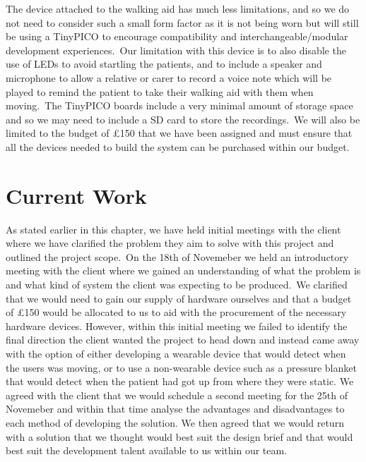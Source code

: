             The device attached to the walking aid has much less limitations, and so we do not need to consider such a
            small form factor as it is not being worn but will still be using a TinyPICO to encourage compatibility and
            interchangeable/modular development experiences.\ Our limitation with this device is to also disable the use
            of LEDs to avoid startling the patients, and to include a speaker and microphone to allow a relative or
            carer to record a voice note which will be played to remind the patient to take their walking aid with them
            when moving.\ The TinyPICO boards include a very minimal amount of storage space and so we may need to
            include a SD card to store the recordings.\ We will also be limited to the budget of £150 that we have been
            assigned and must ensure that all the devices needed to build the system can be purchased within our budget.

    \section{Current Work}
        As stated earlier in this chapter, we have held initial meetings with the client where we have clarified the
        problem they aim to solve with this project and outlined the project scope.\ On the 18th of Novemeber we held an
        introductory meeting with the client where we gained an understanding of what the problem is and what kind of
        system the client was expecting to be produced.\ We clarified that we would need to gain our supply of hardware
        ourselves and that a budget of £150 would be allocated to us to aid with the procurement of the necessary
        hardware devices. However, within this initial meeting we failed to identify the final direction the client
        wanted the project to head down and instead came away with the option of either developing a wearable device
        that would detect when the users was moving, or to use a non-wearable device such as a pressure
        blanket that would detect when the patient had got up from where they were static. We agreed with the client
        that we would schedule a second meeting for the 25th of Novemeber and within that time analyse the advantages
        and disadvantages to each method of developing the solution. We then agreed that we would return with a solution
        that we thought would best suit the design brief and that would best suit the development talent available to us
        within our team.

